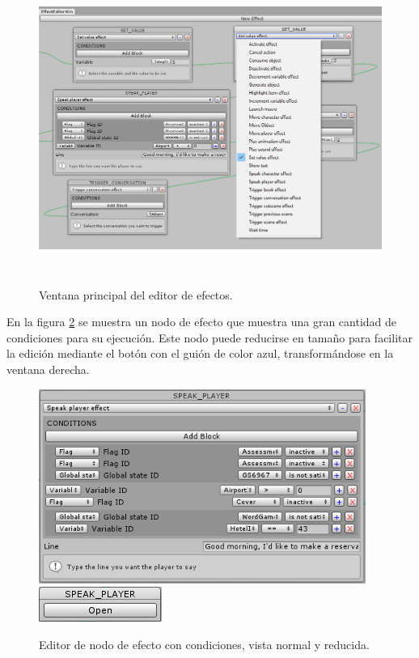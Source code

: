 \begin{figure}[h!]
	\centerline{\includegraphics[height=4in]{figures/it3/effecteditorwindow.png}}
	\caption[Ventana Principal - Editor de Efectos]{Ventana principal del editor de efectos.}
	\label{mainwindow-effecteditor-it3}
\end{figure}

En la figura \ref{effect-nodes-it3} se muestra un nodo de efecto que muestra una gran cantidad de condiciones para su ejecución. Este nodo puede reducirse en tamaño para facilitar la edición mediante el botón con el guión de color azul, transformándose en la ventana derecha.

\begin{figure}[h!]
	\centerline{
		\includegraphics[height=2.5in]{figures/it3/editor-conditions.png}
		\includegraphics{figures/it3/collapsed-effect.png}
		}
	\caption[Editor de Nodo con condiciones - Editor de Efectos]{Editor de nodo de efecto con condiciones, vista normal y reducida.}
	\label{effect-nodes-it3}
\end{figure}

